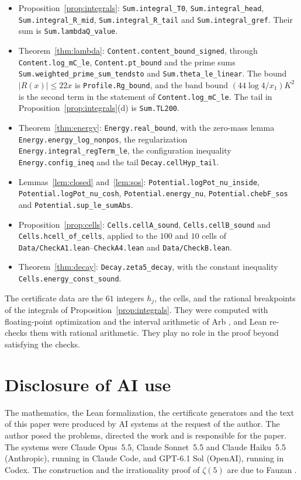 \documentclass[11pt]{amsart}
\theoremstyle{definition}
\theoremstyle{remark}
\numberwithin{equation}{section}
\newcommand{\lean}[1]{\nolinkurl{#1}}
\begin{document}
\begin{itemize}
\item Proposition~\ref{prop:integrals}: \lean{Sum.integral_T0}, \lean{Sum.integral_head}, \lean{Sum.integral_R_mid}, \lean{Sum.integral_R_tail} and
 \lean{Sum.integral_gref}. Their sum is \lean{Sum.lambdaQ_value}.
\item Theorem~\ref{thm:lambda}: \lean{Content.content_bound_signed}, through \lean{Content.log_mC_le}, \lean{Content.pt_bound}
 and the prime sums \lean{Sum.weighted_prime_sum_tendsto} and \lean{Sum.theta_le_linear}. The bound $|R(x)|\le22x$ is
 \lean{Profile.Rg_bound}, and the band bound $(44\log4/x_1)K^2$ is the second term in the statement of \lean{Content.log_mC_le}. The tail
 in Proposition~\ref{prop:integrals}(d) is \lean{Sum.TL200}.
\item Theorem~\ref{thm:energy}: \lean{Energy.real_bound}, with the zero-mass lemma \lean{Energy.energy_log_nonpos},
 the regularization \lean{Energy.integral_regTerm_le}, the configuration inequality \lean{Energy.config_ineq} and the
 tail \lean{Decay.cellHyp_tail}.
\item Lemmas~\ref{lem:closed} and~\ref{lem:sos}: \lean{Potential.logPot_nu_inside}, \lean{Potential.logPot_nu_cosh},
 \lean{Potential.energy_nu}, \lean{Potential.chebF_sos} and \lean{Potential.sup_le_sumAbs}.
\item Proposition~\ref{prop:cells}: \lean{Cells.cellA_sound}, \lean{Cells.cellB_sound} and \lean{Cells.hcell_of_cells},
 applied to the $100$ and $10$ cells of \lean{Data/CheckA1.lean}--\lean{CheckA4.lean} and \lean{Data/CheckB.lean}.
\item Theorem~\ref{thm:decay}: \lean{Decay.zeta5_decay}, with the constant inequality \lean{Cells.energy_const_sound}.
\end{itemize}
The certificate data are the $61$ integers $h_j$, the cells, and the rational breakpoints of the integrals of
Proposition~\ref{prop:integrals}. They were computed with floating-point optimization and the interval arithmetic of
Arb \cite{Arb}, and Lean re-checks them with rational arithmetic. They play no role in the proof beyond satisfying the
checks.

\section*{Disclosure of AI use}
The mathematics, the Lean formalization, the certificate generators and the text of this paper were produced by AI
systems at the request of the author. The author posed the problems, directed the work and is responsible for the
paper. The systems were Claude Opus~5.5, Claude Sonnet~5.5 and Claude Haiku~5.5 (Anthropic), running in Claude Code,
and GPT-6.1 Sol (OpenAI), running in Codex. The construction and the irrationality proof of $\zeta(5)$ are due to
Fauzan \cite{Fauzan2026}.
\end{document}
